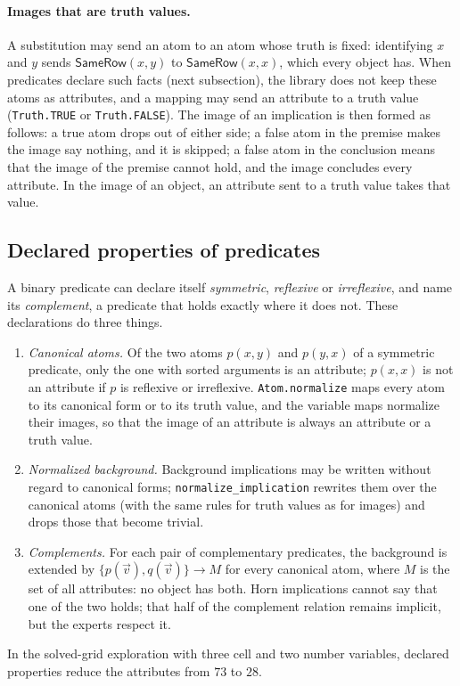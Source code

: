 \documentclass[11pt,a4paper]{article}
\theoremstyle{definition}
\theoremstyle{remark}
\newcommand{\code}[1]{\texttt{#1}}
\newcommand{\pred}[1]{\mathsf{#1}}
\begin{document}
\paragraph{Images that are truth values.}
A substitution may send an atom to an atom whose truth is fixed: identifying $x$ and $y$ sends $\pred{SameRow}(x, y)$ to $\pred{SameRow}(x, x)$, which every object has. When predicates declare such facts (next subsection), the library does not keep these atoms as attributes, and a mapping may send an attribute to a truth value (\code{Truth.TRUE} or \code{Truth.FALSE}). The image of an implication is then formed as follows: a true atom drops out of either side; a false atom in the premise makes the image say nothing, and it is skipped; a false atom in the conclusion means that the image of the premise cannot hold, and the image concludes every attribute. In the image of an object, an attribute sent to a truth value takes that value.

\subsection{Declared properties of predicates}\label{sec:properties}

A binary predicate can declare itself \emph{symmetric}, \emph{reflexive} or \emph{irreflexive}, and name its \emph{complement}, a predicate that holds exactly where it does not. These declarations do three things.
\begin{enumerate}
  \item \emph{Canonical atoms.} Of the two atoms $p(x, y)$ and $p(y, x)$ of a symmetric predicate, only the one with sorted arguments is an attribute; $p(x, x)$ is not an attribute if $p$ is reflexive or irreflexive. \code{Atom.normalize} maps every atom to its canonical form or to its truth value, and the variable maps normalize their images, so that the image of an attribute is always an attribute or a truth value.
  \item \emph{Normalized background.} Background implications may be written without regard to canonical forms; \code{normalize\_implication} rewrites them over the canonical atoms (with the same rules for truth values as for images) and drops those that become trivial.
  \item \emph{Complements.} For each pair of complementary predicates, the background is extended by $\{p(\vec v), q(\vec v)\} \to M$ for every canonical atom, where $M$ is the set of all attributes: no object has both. Horn implications cannot say that one of the two holds; that half of the complement relation remains implicit, but the experts respect it.
\end{enumerate}
In the solved-grid exploration with three cell and two number variables, declared properties reduce the attributes from $73$ to $28$.
\end{document}
